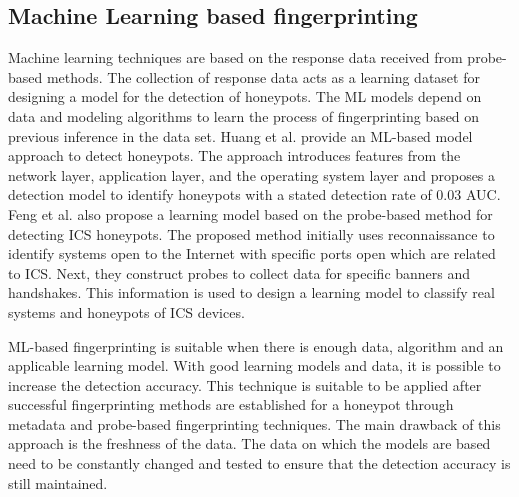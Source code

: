 \subsection{Machine Learning based fingerprinting}
Machine learning techniques are based on the response data received from probe-based methods. The collection of response data acts as a learning dataset for designing a model for the detection of honeypots. The ML models depend on data and modeling algorithms to learn the process of fingerprinting based on previous inference in the data set. Huang et al. \cite{huang} provide an ML-based model approach to detect honeypots. The approach introduces features from the network layer, application layer, and the operating system layer and proposes a detection model to identify honeypots with a stated detection rate of 0.03 AUC. Feng et al. \cite{Feng2016} also propose a learning model based on the probe-based method for detecting ICS honeypots. The proposed method initially uses reconnaissance to identify systems open to the Internet with specific ports open which are related to ICS. Next, they construct probes to collect data for specific banners and handshakes. This information is used to design a learning model to classify real systems and honeypots of ICS devices.

ML-based fingerprinting is suitable when there is enough data, algorithm and an applicable learning model. With good learning models and data, it is possible to increase the detection accuracy. This technique is suitable to be applied after successful fingerprinting methods are established for a honeypot through metadata and probe-based fingerprinting techniques. The main drawback of this approach is the freshness of the data. The data on which the models are based need to be constantly changed and tested to ensure that the detection accuracy is still maintained.  
